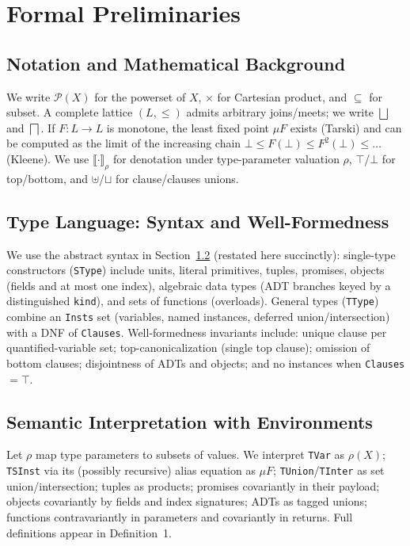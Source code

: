 \documentclass[11pt]{article}
\begin{document}
\section{Formal Preliminaries}
\subsection{Notation and Mathematical Background}
We write $\mathcal{P}(X)$ for the powerset of $X$, $\times$ for Cartesian product, and $\subseteq$ for subset. A complete lattice $(L,\leq)$ admits arbitrary joins/meets; we write $\bigsqcup$ and $\bigsqcap$. If $F:L\to L$ is monotone, the least fixed point $\mu F$ exists (Tarski) and can be computed as the limit of the increasing chain $\bot \leq F(\bot) \leq F^2(\bot) \leq \dots$ (Kleene). We use $\llbracket\cdot\rrbracket_\rho$ for denotation under type-parameter valuation $\rho$, $\top$/$\bot$ for top/bottom, and $\uplus$/$\sqcup$ for clause/clauses unions.

\subsection{Type Language: Syntax and Well-Formedness}\label{sec:union-syntax-wf}
We use the abstract syntax in Section~\ref{sec:union-syntax-wf} (restated here succinctly): single-type constructors (\texttt{SType}) include units, literal primitives, tuples, promises, objects (fields and at most one index), algebraic data types (ADT branches keyed by a distinguished \texttt{kind}), and sets of functions (overloads). General types (\texttt{TType}) combine an \texttt{Insts} set (variables, named instances, deferred union/intersection) with a DNF of \texttt{Clauses}. Well-formedness invariants include: unique clause per quantified-variable set; top-canonicalization (single top clause); omission of bottom clauses; disjointness of ADTs and objects; and no instances when \texttt{Clauses}$=\top$.

\subsection{Semantic Interpretation with Environments}
Let $\rho$ map type parameters to subsets of values. We interpret \texttt{TVar} as $\rho(X)$; \texttt{TSInst} via its (possibly recursive) alias equation as $\mu F$; \texttt{TUnion}/\texttt{TInter} as set union/intersection; tuples as products; promises covariantly in their payload; objects covariantly by fields and index signatures; ADTs as tagged unions; functions contravariantly in parameters and covariantly in returns. Full definitions appear in Definition~1.
\end{document}
